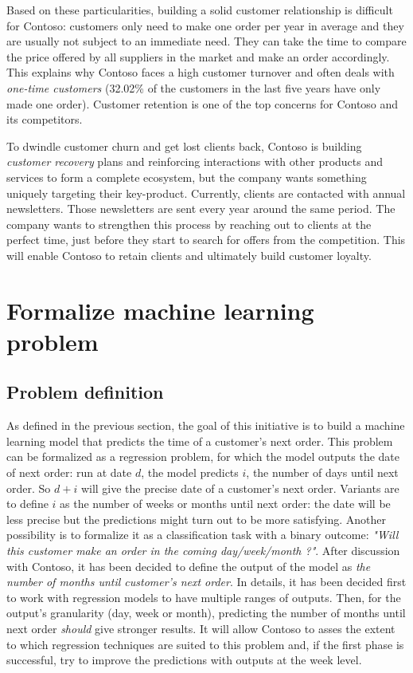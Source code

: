  Based on these particularities, building a solid customer relationship is difficult for Contoso: customers only need to make one order per year in average and they are usually not subject to an immediate need. They can take the time to compare the price offered by all suppliers in the market and make an order accordingly. This explains why Contoso faces a high customer turnover and often deals with \textit{one-time customers} (32.02\% of the customers in the last five years have only made one order). Customer retention is one of the top concerns for Contoso and its competitors.
 
 To dwindle customer churn and get lost clients back, Contoso is building \textit{customer recovery} plans and reinforcing interactions with other products and services to form a complete ecosystem, but the company wants something uniquely targeting their key-product. Currently, clients are contacted with annual newsletters. Those newsletters are sent every year around the same period. The company wants to strengthen this process by reaching out to clients at the perfect time, just before they start to search for offers from the competition. This will enable Contoso to retain clients and ultimately build customer loyalty.
 
 
\section{Formalize machine learning problem} \label{sec:ml-metrics}


\subsection{Problem definition}
As defined in the previous section, the goal of this initiative is to build a machine learning model that predicts the time of a customer's next order. This problem can be formalized as a regression problem, for which the model outputs the date of next order: run at date $d$, the model predicts $i$, the number of days until next order. So $d+i$ will give the precise date of a customer's next order. Variants are to define $i$ as the number of weeks or months until next order: the date will be less precise but the predictions might turn out to be more satisfying. Another possibility is to formalize it as a classification task with a binary outcome: \textit{"Will this customer make an order in the coming day/week/month ?"}. After discussion with Contoso, it has been decided to define the output of the model as \textit{the number of months until customer's next order}. In details, it has been decided first to work with regression models to have multiple ranges of outputs. Then, for the output's granularity (day, week or month), predicting the number of months until next order \textit{should} give stronger results. It will allow Contoso to asses the extent to which regression techniques are suited to this problem and, if the first phase is successful, try to improve the predictions with outputs at the week level.



